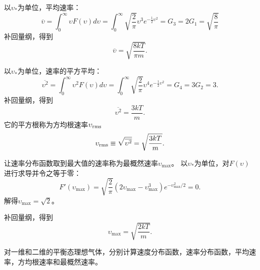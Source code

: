 \documentclass[CJK]{beamer}
\begin{document}
\begin{frame}
\bch
{\large
以$\upsilon_*$为单位，平均速率：
$$\overline{\upsilon} = \int_0^\infty \upsilon F(\upsilon)d\upsilon = \int_0^\infty \sqrt{\frac{2}{\pi}}\upsilon^3 e^{-\frac{1}{2}\upsilon^2} = G_3 =2G_1 = \sqrt{\frac{8}{\pi}} $$
补回量纲，得到
{\blue $$\overline{\upsilon} = \sqrt{\frac{8kT}{\pi m}}. $$}}
\ech
\end{frame}


\begin{frame}
\bch
以$\upsilon_*$为单位，速率的平方平均：
$$\overline{\upsilon^2} = \int_0^\infty \upsilon^2 F(\upsilon)d\upsilon = \int_0^\infty \sqrt{\frac{2}{\pi}}\upsilon^4 e^{-\frac{1}{2}\upsilon^2} = G_4 =3G_2 = 3. $$
补回量纲，得到
 $$\overline{\upsilon^2} = \frac{3kT}{ m}. $$
它的平方根称为{\blue 方均根速率$\upsilon_{\rm rms}$
$$\upsilon_{\rm rms} \equiv \sqrt{\overline{\upsilon^2}} = \sqrt{ \frac{3kT}{ m}} .$$}
\ech
\end{frame}

\begin{frame}
\bch
{\large 让速率分布函数取到最大值的速率称为{\blue 最概然速率$\upsilon_{\max}$}。
以$\upsilon_*$为单位，对$F(\upsilon)$进行求导并令之等于零：
$$F'(\upsilon_{\max}) = \sqrt{\frac{2}{\pi}}(2\upsilon_{\max} - \upsilon_{\max}^3)e^{-\upsilon_{\max}^2/2} = 0. $$
解得$\upsilon_{\max} = \sqrt{2}$。

补回量纲，得到
{\blue $$\upsilon_{\max} = \sqrt{\frac{2kT}{ m}}. $$}
}
\ech
\end{frame}

\begin{frame}
\bch

对一维和二维的平衡态理想气体，分别计算速度分布函数，速率分布函数，平均速率，方均根速率和最概然速率。
\ech
\end{frame}
\end{document}
